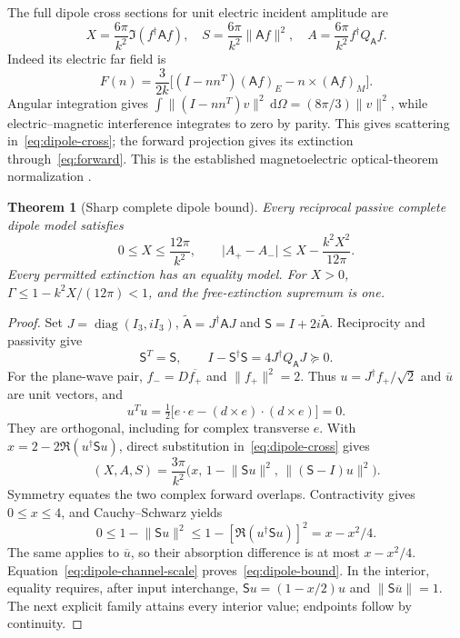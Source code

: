 \documentclass[11pt,a4paper]{article}
\newtheorem{theorem}{Theorem}[section]
\theoremstyle{remark}
\newcommand{\norm}[1]{\lVert #1\rVert}
\newcommand{\abs}[1]{\lvert #1\rvert}
\newcommand{\dd}{\,\mathrm d}
\newcommand{\diag}{\operatorname{diag}}
\begin{document}
The full dipole cross sections for unit electric incident amplitude are
\begin{equation}\label{eq:dipole-cross}
 X=\frac{6\pi}{k^2}\Im(f^\dagger\mathsf A f),\quad
 S=\frac{6\pi}{k^2}\norm{\mathsf A f}^2,\quad
 A=\frac{6\pi}{k^2}f^\dagger Q_{\mathsf A}f.
\end{equation}
Indeed its electric far field is
\[
 F(n)=\frac3{2k}\bigl[(I-nn^T)(\mathsf A f)_E-n\times(\mathsf A f)_M\bigr].
\]
Angular integration gives $\int\norm{(I-nn^T)v}^2\dd\Omega=(8\pi/3)\norm v^2$, while electric--magnetic interference integrates to zero by parity. This gives scattering in~\eqref{eq:dipole-cross}; the forward projection gives its extinction through~\eqref{eq:forward}. This is the established magnetoelectric optical-theorem normalization \citep{Sersic2011}.

\begin{theorem}[Sharp complete dipole bound]\label{thm:dipole}
Every reciprocal passive complete dipole model satisfies
\begin{equation}\label{eq:dipole-bound}
 0\leq X\leq\frac{12\pi}{k^2},\qquad
 \abs{A_+-A_-}\leq X-\frac{k^2X^2}{12\pi}.
\end{equation}
Every permitted extinction has an equality model. For $X>0$, $\Gamma\leq1-k^2X/(12\pi)<1$, and the free-extinction supremum is one.
\end{theorem}
\begin{proof}
Set $J=\diag(I_3,iI_3)$, $\widetilde{\mathsf A}=J^\dagger\mathsf A J$ and $\mathsf S=I+2i\widetilde{\mathsf A}$. Reciprocity and passivity give
\[
 \mathsf S^T=\mathsf S,\qquad I-\mathsf S^\dagger\mathsf S=4J^\dagger Q_{\mathsf A}J\succeq0.
\]
For the plane-wave pair, $f_-=D\overline{f_+}$ and $\norm{f_+}^2=2$. Thus $u=J^\dagger f_+/\sqrt2$ and $\overline u$ are unit vectors, and
\[
 u^Tu=\tfrac12\bigl[e\cdot e-(d\times e)\cdot(d\times e)\bigr]=0.
\]
They are orthogonal, including for complex transverse $e$. With $x=2-2\Re(u^\dagger\mathsf S u)$, direct substitution in~\eqref{eq:dipole-cross} gives
\begin{equation}\label{eq:dipole-channel-scale}
 (X,A,S)=\frac{3\pi}{k^2}\bigl(x,\,1-\norm{\mathsf S u}^2,\,\norm{(\mathsf S-I)u}^2\bigr).
\end{equation}
Symmetry equates the two complex forward overlaps. Contractivity gives $0\leq x\leq4$, and Cauchy--Schwarz yields
\[
 0\leq1-\norm{\mathsf S u}^2\leq1-[\Re(u^\dagger\mathsf S u)]^2=x-x^2/4.
\]
The same applies to $\overline u$, so their absorption difference is at most $x-x^2/4$. Equation~\eqref{eq:dipole-channel-scale} proves~\eqref{eq:dipole-bound}. In the interior, equality requires, after input interchange, $\mathsf S u=(1-x/2)u$ and $\norm{\mathsf S\overline u}=1$. The next explicit family attains every interior value; endpoints follow by continuity.
\end{proof}
\end{document}
